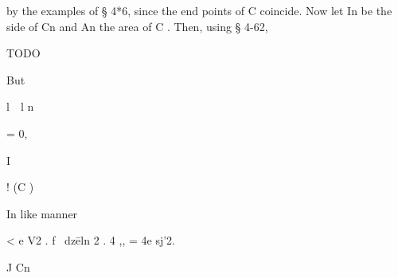 by the examples of § 4*6, since the end points of C coincide. Now let
In be the side of Cn and An the area of C . Then, using § 4-62,

TODO

But



l\ \ l n



= 0,



I



! (C )



In like manner



< e V2 . f \ dz\= eln \/2 . 4 ,, = 4e sj'2.

J Cn

